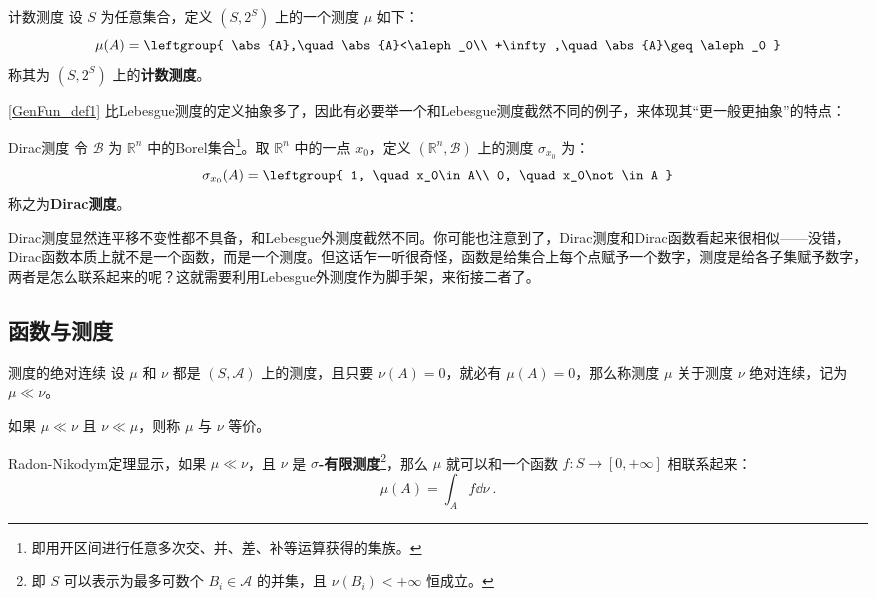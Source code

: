 \begin{example}{计数测度}
设 $S$ 为任意集合，定义 $(S, 2^S)$ 上的一个测度 $\mu$ 如下：
\begin{equation}
\mu(A)=
\leftgroup{
    \abs{A},\quad \abs{A}<\aleph_0\\
    +\infty,\quad \abs{A}\geq\aleph_0
}
\end{equation}
称其为 $(S, 2^S)$ 上的\textbf{计数测度}。
\end{example}

\autoref{GenFun_def1} 比Lebesgue测度的定义抽象多了，因此有必要举一个和Lebesgue测度截然不同的例子，来体现其“更一般更抽象”的特点：

\begin{example}{Dirac测度}
令 $\mathcal{B}$ 为 $\mathbb{R}^n$ 中的Borel集合\footnote{即用开区间进行任意多次交、并、差、补等运算获得的集族。}。取 $\mathbb{R}^n$ 中的一点 $x_0$，定义 $(\mathbb{R}^n, \mathcal{B})$ 上的测度 $\sigma_{x_0}$ 为：
\begin{equation}
\sigma_{x_0}(A)=\leftgroup{
    1, \quad x_0\in A\\
    0, \quad x_0\not\in A
}
\end{equation}
称之为\textbf{Dirac测度}。
\end{example}

Dirac测度显然连平移不变性都不具备，和Lebesgue外测度截然不同。你可能也注意到了，Dirac测度和Dirac函数看起来很相似——没错，Dirac函数本质上就不是一个函数，而是一个测度。但这话乍一听很奇怪，函数是给集合上每个点赋予一个数字，测度是给各子集赋予数字，两者是怎么联系起来的呢？这就需要利用Lebesgue外测度作为脚手架，来衔接二者了。





\subsection{函数与测度}




\begin{definition}{测度的绝对连续}
设 $\mu$ 和 $\nu$ 都是 $(S, \mathcal{A})$ 上的测度，且只要 $\nu(A)=0$，就必有 $\mu(A)=0$，那么称测度 $\mu$ 关于测度 $\nu$ 绝对连续，记为 $\mu\ll\nu$。

如果 $\mu\ll\nu$ 且 $\nu\ll\mu$，则称 $\mu$ 与 $\nu$ 等价。
\end{definition}



Radon-Nikodym定理显示，如果 $\mu\ll\nu$，且 $\nu$ 是 $\sigma$\textbf{-有限测度}\footnote{即 $S$ 可以表示为最多可数个 $B_i\in\mathcal{A}$ 的并集，且 $\nu(B_i)<+\infty$ 恒成立。}，那么 $\mu$ 就可以和一个函数 $f:S\to [0, +\infty]$ 相联系起来：
\begin{equation}
\mu(A) = \int_A f \dd \nu~.
\end{equation}


